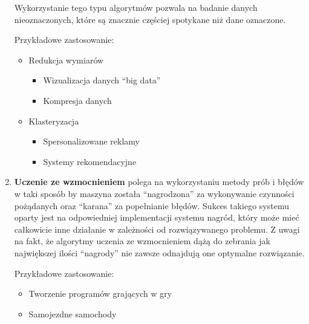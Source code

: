 \begin{enumerate}
\begin{enumerate}
    \end{enumerate} 
    Wykorzystanie tego typu algorytmów pozwala na badanie danych nieoznaczonych,
    które są znacznie częściej spotykane niż dane oznaczone.
    
    Przykładowe zastosowanie:
    \begin{itemize}
        \item Redukcja wymiarów
        \begin{itemize}
            \item Wizualizacja danych ``big data''
            \item Kompresja danych
        \end{itemize}
        \item Klasteryzacja
        \begin{itemize}
            \item Spersonalizowane reklamy
            \item Systemy rekomendacyjne
        \end{itemize}
    \end{itemize}
    \item \textbf{Uczenie ze wzmocnieniem}
    polega na wykorzystaniu metody prób i błędów w taki sposób by maszyna została
    ``nagrodzona'' za wykonywanie czynności pożądanych oraz ``karana'' za popełnianie błędów. 
    Sukces takiego systemu oparty jest na odpowiedniej implementacji systemu nagród, który może 
    mieć całkowicie inne działanie w zależności od rozwiązywanego problemu. 
    Z uwagi na fakt, że algorytmy uczenia ze wzmocnieniem dążą do zebrania jak największej
    ilości ``nagrody'' nie zawsze odnajdują one optymalne rozwiązanie.
    
    Przykładowe zastosowanie:
    \begin{itemize}
        \item Tworzenie programów grających w gry
        \item Samojezdne samochody
    \end{itemize}
\end{enumerate} 

